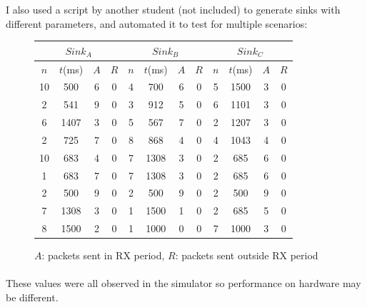 \documentclass{article}
\begin{document}
I also used a script by another student (not included) to generate sinks with different parameters,
and automated it to test for multiple scenarios:

\begin{figure}
\begin{tabular}{|c|c|c|c||c|c|c|c||c|c|c|c|}
  \hline 
  \multicolumn{4}{|c||}{$Sink_{A}$} & \multicolumn{4}{c||}{$Sink_{B}$} & \multicolumn{4}{c|}{$Sink_{C}$}\tabularnewline
  \hline 
  $n$ & $t$(ms) & $A$ & $R$ & $n$ & $t$(ms) & $A$ & $R$ & $n$ & $t$(ms) & $A$ & $R$\tabularnewline
  \hline 
  \hline 
  10 & 500 & 6 & 0 & 4 & 700 & 6 & 0 & 5 & 1500 & 3 & 0\tabularnewline
  \hline 
  2 & 541 & 9 & 0 & 3 & 912 & 5 & 0 & 6 & 1101 & 3 & 0\tabularnewline
  \hline 
  6 & 1407 & 3 & 0 & 5 & 567 & 7 & 0 & 2 & 1207 & 3 & 0\tabularnewline
  \hline 
  2 & 725 & 7 & 0 & 8 & 868 & 4 & 0 & 4 & 1043 & 4 & 0\tabularnewline
  \hline 
  10 & 683 & 4 & 0 & 7 & 1308 & 3 & 0 & 2 & 685 & 6 & 0\tabularnewline
  \hline 
  1 & 683 & 7 & 0 & 7 & 1308 & 3 & 0 & 2 & 685 & 6 & 0\tabularnewline
  \hline 
  2 & 500 & 9 & 0 & 2 & 500 & 9 & 0 & 2 & 500 & 9 & 0\tabularnewline
  \hline 
  7 & 1308 & 3 & 0 & 1 & 1500 & 1 & 0 & 2 & 685 & 5 & 0\tabularnewline
  \hline 
  8 & 1500 & 2 & 0 & 1 & 1000 & 0 & 0 & 7 & 1000 & 3 & 0\tabularnewline
  \hline 
\end{tabular}
\caption{$A$: packets sent in RX period, $R$: packets sent outside RX period}
\end{figure}
\paragraph{}

These values were all observed in the simulator so performance on hardware may be different.\

\paragraph{}


\end{document}
